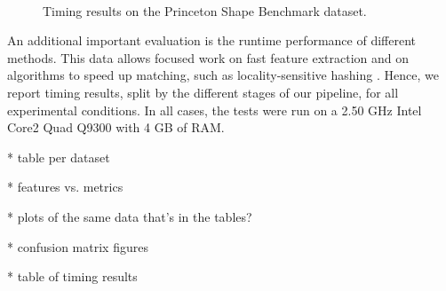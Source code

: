 \begin{figure}[thpb]
\centering
{}
 \\
\vspace{1em}
\caption{Timing results on the Princeton Shape Benchmark dataset.}
\label{fig:PSB_timing}
\end{figure}

%

An additional important evaluation is the runtime performance of different methods.
This data allows focused work on fast feature extraction and on algorithms to speed up matching, such as locality-sensitive hashing \cite{Frome2004}.
Hence, we report timing results, split by the different stages of our pipeline, for all experimental conditions.
In all cases, the tests were run on a 2.50 GHz Intel Core2 Quad Q9300 with 4 GB of RAM.

* table per dataset

* features vs. metrics

* plots of the same data that's in the tables?

* confusion matrix figures

* table of timing results
